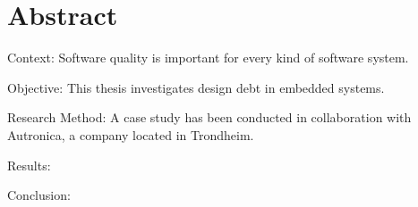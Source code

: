 

\section*{\Large Abstract}
Context: Software quality is important for every kind of software system. 

Objective: This thesis investigates design debt in embedded systems.

Research Method: A case study has been conducted in collaboration with Autronica, a company located in Trondheim. 

Results: 

Conclusion: